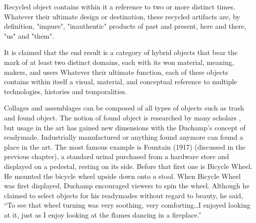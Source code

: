 Recycled object contains within it a reference to two or more distinct times. Whatever their ultimate design or destination, these recycled artifacts are, by definition, "impure", "inauthentic" products of past and present, here and there, "us" and "them". 

It is claimed that the end result is a category of hybrid objects that bear the mark of at least two distinct domains, each with its won material, meaning, makers, and users \citep{cerny1996recycled} Whatever their ultimate function, each of these objects contains within itself a visual, material, and conceptual reference to multiple technologies, histories and temporalities.

Collages and assemblages can be composed of all types of objects such as trash and found object. The notion of found object is researched by many scholars 
, but usage in the art has gained new dimensions with the Duchamp's concept of readymade. Industrially manufactured or anything found  anymore can found a place in the art. The most famous example is Fountain (1917) (discussed in the previous chapter), a standard urinal purchased from a hardware store and displayed on a pedestal, resting on its side. Before that first one is Bicycle Wheel. He mounted the bicycle wheel upside down onto a stool. 
When Bicycle Wheel was first displayed, Duchamp encouraged viewers to spin the wheel. Although he claimed to select objects for his readymades without regard to beauty, he said, “To see that wheel turning was very soothing, very comforting\ldots I enjoyed looking at it, just as I enjoy looking at the flames dancing in a fireplace.”







